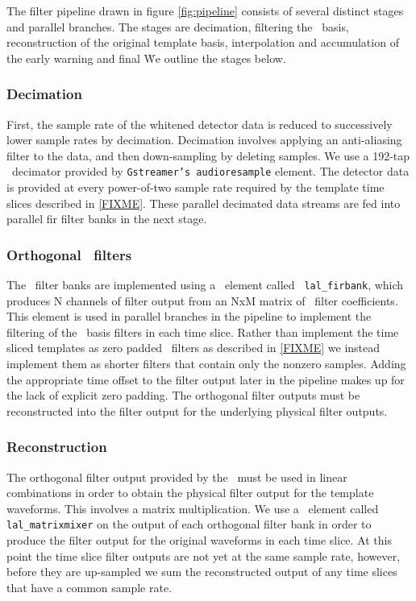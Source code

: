 The filter pipeline drawn in figure \ref{fig:pipeline} consists of several
distinct stages and parallel branches.  The stages are decimation, filtering
the \SVD\ basis, reconstruction of the original template basis, interpolation
and accumulation of the early warning and final \SNR\.  We outline the stages
below. 

\subsubsection{Decimation}

First, the sample rate of the whitened detector data is reduced to successively
lower sample rates by decimation.  Decimation involves applying an anti-aliasing
filter to the data, and then down-sampling by deleting samples.  We use a
192-tap \fir\ decimator provided by {\tt Gstreamer's audioresample}
element.  The detector data is provided at every power-of-two sample rate
required by the template time slices described in \eqref{FIXME}.  These
parallel decimated data streams are fed into parallel fir filter banks in the
next stage.

\subsubsection{Orthogonal \fir\ filters}

The \fir\ filter banks are implemented using a \gstlal\ element called {\tt
lal\_firbank}, which produces N channels of filter output from an NxM matrix of
\fir\ filter coefficients.  This element is used in parallel branches in the
pipeline to implement the filtering of the \SVD\ basis filters in each time
slice.  Rather than implement the time sliced templates as zero padded \fir\
filters as described in \eqref{FIXME} we instead implement them as shorter
filters that contain only the nonzero samples.  Adding the appropriate time
offset to the filter output later in the pipeline makes up for the lack of
explicit zero padding.  The orthogonal filter outputs must be reconstructed
into the filter output for the underlying physical filter outputs. 

\subsubsection{Reconstruction}

The orthogonal filter output provided by the \SVD\ must be used in linear
combinations in order to obtain the physical filter output for the template
waveforms.  This involves a matrix multiplication.  We use a \gstlal\ element
called {\tt lal\_matrixmixer} on the output of each orthogonal filter bank in
order to produce the filter output for the original waveforms in each time
slice.  At this point the time slice filter outputs are not yet at the same
sample rate, however, before they are up-sampled we sum the reconstructed output
of any time slices that have a common sample rate.

